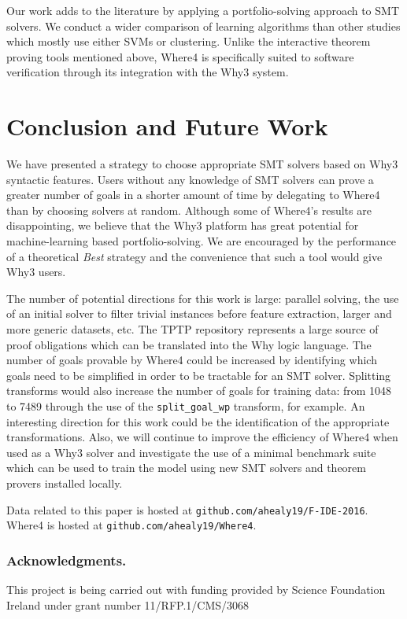 \documentclass[runningheads,a4paper]{llncs}
\begin{document}
Our work adds to the literature by applying a portfolio-solving approach to SMT solvers. We conduct a wider comparison of learning algorithms than other studies which mostly use either SVMs or clustering. Unlike the interactive theorem proving tools mentioned above, \textsf{Where4} is specifically suited to software verification through its integration with the \textsf{Why3} system.

\section{Conclusion and Future Work}

We have presented a strategy to choose appropriate SMT solvers based on \textsf{Why3} syntactic features. Users without any knowledge of SMT solvers can prove a greater number of goals in a shorter amount of time by delegating to \textsf{Where4} than by choosing solvers at random. Although some of \textsf{Where4}'s results are disappointing, we believe that the \textsf{Why3} platform has great potential for machine-learning based portfolio-solving. We are encouraged by the performance of a theoretical \textit{Best} strategy and the convenience that such a tool would give \textsf{Why3} users.

The number of potential directions for this work is large: parallel solving, the use of an initial solver to filter trivial instances before feature extraction, larger and more generic datasets, etc. 
The TPTP repository represents a large source of proof obligations which can be translated into the Why logic language. The number of goals provable by \textsf{Where4} could be increased by identifying which goals need to be simplified in order to be tractable for an SMT solver. Splitting transforms would also increase the number of goals for training data: from 1048 to 7489 through the use of the \texttt{split\_goal\_wp} transform, for example.  An interesting direction for this work could be the identification of the appropriate transformations. Also, we will continue to improve the efficiency of \textsf{Where4} when used as a \textsf{Why3} solver and investigate the use of a minimal benchmark suite which can be used to train the model using new SMT solvers and theorem provers installed locally.  

Data related to this paper is hosted at \texttt{github.com/ahealy19/F-IDE-2016}. \textsf{Where4} is hosted at \texttt{github.com/ahealy19/Where4}. 

\subsubsection*{Acknowledgments.}This project is being carried out with funding provided by Science Foundation Ireland under grant number 11/RFP.1/CMS/3068




\end{document}
